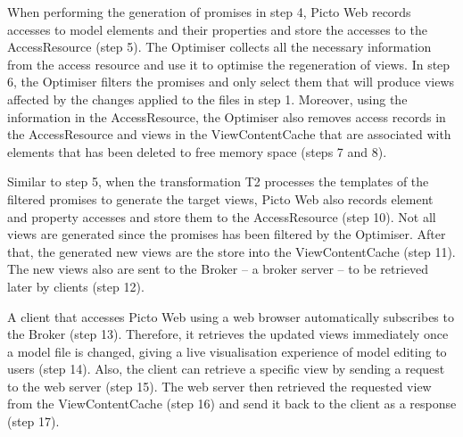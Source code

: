 When performing the generation of promises in step 4, Picto Web records accesses to model elements and their properties and store the accesses to the \textsf{AccessResource} (step 5). The \textsf{Optimiser} collects all the necessary information from the access resource and use it to optimise the regeneration of views. In step 6, the \textsf{Optimiser} filters the promises and only select them that will produce views affected by the changes applied to the files in step 1. Moreover, using the information in the \textsf{AccessResource}, the \textsf{Optimiser} also removes access records in the \textsf{AccessResource} and views in the \textsf{ViewContentCache} that are associated with elements that has been deleted to free memory space (steps 7 and 8). 

Similar to step 5, when the transformation \textsf{T2} processes the templates of the filtered promises to generate the target views, Picto Web also records element and property accesses and store them to the \textsf{AccessResource} (step 10). Not all views are generated since the promises has been filtered by the \textsf{Optimiser}. After that, the generated new views are the store into the \textsf{ViewContentCache} (step 11). The new views also are sent to the \textsf{Broker} -- a broker server --  to be retrieved later by clients (step 12).

A client that accesses Picto Web using a web browser automatically subscribes to the \textsf{Broker} (step 13). Therefore, it retrieves the updated views immediately once a model file is changed, giving a live visualisation experience of model editing to users (step 14). Also, the client can retrieve a specific view by sending a request to the web server (step 15). The web server then retrieved the requested view from the \textsf{ViewContentCache} (step 16) and send it back to the client as a response (step 17).









